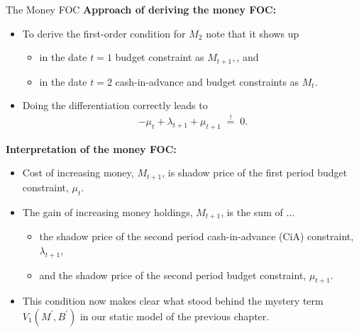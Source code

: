 \documentclass[10pt,c,aspectratio=1610,handout]{beamer}
\begin{document}
\begin{frame}{The Money FOC}%
  \textbf{Approach of deriving the money FOC:}%
  \begin{itemize}%
    \item[$\blacktriangleright$] To derive the first-order condition for $M_{2}$ note that it shows up%
    \begin{itemize}%
      \item[$\rightarrow$] in the date $t=1$ budget constraint as $M_{t+1},$, and%
      \item[$\rightarrow$] in the date $t=2$ cash-in-advance and budget constraints as $M_{t}$.%
    \end{itemize}%
    \pause%
    \item[$\blacktriangleright$] Doing the differentiation correctly leads to%
    \begin{align}%
      -\mu_{t} + \lambda_{t+1} + \mu_{t+1} \; \overset{!}{=} \; 0.%
    \end{align}%
  \end{itemize}%
  \pause%
  \textbf{Interpretation of the money FOC:}%
  \begin{itemize}%
    \item[$\blacktriangleright$] Cost of increasing money, $M_{t+1}$, is shadow price of the first period budget constraint, $\mu _{t}$.%
    \item[$\blacktriangleright$] The gain of increasing money holdings, $M_{t+1}$, is the sum of ...%
    \begin{itemize}%
      \item[$\rightarrow$] the shadow price of the second period cash-in-advance (CiA) constraint, $\lambda_{t+1}$,%
      \item[$\rightarrow$] and the shadow price of the second period budget constraint, $\mu_{t+1} $.%
    \end{itemize}%
    \item[$\blacktriangleright$] This condition now makes clear what stood behind the mystery term $V_{1}(M^{\prime },B^{\prime })$ in our static model of the previous chapter.%
  \end{itemize}%
\end{frame}%
\end{document}

